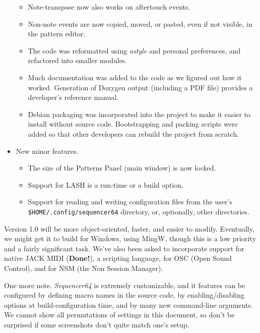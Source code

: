 \documentclass[
 11pt,
 twoside,
 a4paper,
 headinclude,
 footinclude,
 final                                 %
]{article}
\begin{document}
\begin{itemize}
\begin{itemize}
         \item Note-transpose now also works on aftertouch events.
         \item Non-note events are now copied, moved, or pasted, even if not
            visible, in the pattern editor.
         \item The code was reformatted using \textsl{astyle} and
            personal preferences, and refactored into smaller modules.
         \item Much documentation was added to the code as we figured
            out how it worked.  Generation of Doxygen output (including a PDF
            file) provides a developer's reference manual.
         \item Debian packaging was incorporated into the project to make it
            easier to install without source code.  Bootstrapping and
            packing scripts were added so that other developers can rebuild the
            project from scratch.
      \end{itemize}
      \item New minor features.
      \begin{itemize}
         \item The size of the Patterns Panel (main window) is now locked.
         \item Support for LASH is a run-time or a build option.
         \item Support for reading and writing configuration files from the
            user's \texttt{\$HOME/.config/sequencer64} directory, or,
            optionally, other directories.
      \end{itemize}
   \end{itemize}

   Version 1.0 will be more object-oriented,
   faster, and easier to modify.  Eventually, we might get it to build
   for Windows, using MingW, though this is a low priority and a fairly
   significant task.  We've also been asked to incorporate support for native
   JACK MIDI (\textbf{Done!}), a scripting language, for OSC (Open Sound
   Control), and for NSM (the Non Session Manager).

   One more note.  \textsl{Sequencer64} is extremely customizable, and
   it features can be configured by defining macro names in the source code,
   by enabling/disabling options at build-configuration time, and by many new
   command-line arguments.  We cannot show all permutations of settings in this
   document, so don't be surprised if some screenshots don't quite match
   one's setup.
\end{document}
